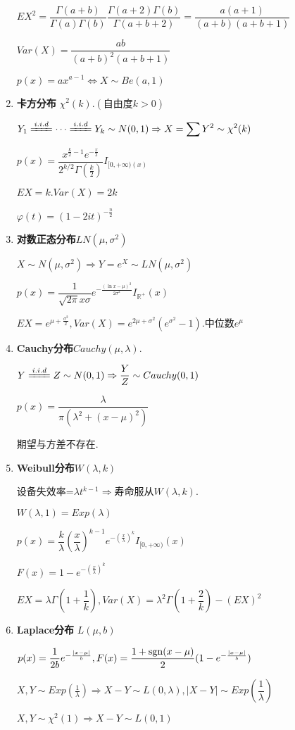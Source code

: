 \begin{enumerate}
    $ EX^2 = \dfrac{\Gamma(a+b)}{\Gamma(a)\Gamma(b)}\dfrac{\Gamma(a+2)\Gamma(b)}{\Gamma(a+b+2)} = \dfrac{a(a+1)}{(a+b)(a+b+1)}$

    $ Var(X) = \dfrac{ab}{(a+b)^2(a+b+1)}$

    $ p(x)=ax^{a-1}\Leftrightarrow X\sim Be(a,1)$

  \item \textbf{卡方分布} $ \chi^2(k).(自由度k>0)$

    $ Y_1 \xlongequal{i.i.d} \cdots \xlongequal{i.i.d} Y_k \sim N(0,1)
    \Rightarrow X = \sum{Y^2}\sim \chi^2(k)$

  $ p(x) = \dfrac{x^{\frac{k}{2}-1}e^{-\frac{x}{2}}}{2^{k/2}\Gamma(\frac{k}{2})} I_{[0,+\infty)(x)}$

    $ EX = k. Var(X) = 2k$

    $ \varphi(t) = (1-2it)^{-\frac{n}{2}}$

  \item \textbf{对数正态分布}$ LN(\mu, \sigma^2)$

    $ X\sim N(\mu,\sigma^2)\Rightarrow Y = e^{X}\sim LN(\mu,\sigma^2)$

    $ p(x) = \dfrac{1}{\sqrt{2\pi}x\sigma}e^{-\frac{(\ln x- \mu)^2}{2\sigma^2}}I_{\mathbb{R}^{+}}(x)$

    $ EX = e^{\mu + \frac{\sigma^2}{2}}, Var(X) = e^{2\mu+\sigma^2}(e^{\sigma^2}-1). 中位数e^\mu$

  \item \textbf{Cauchy分布}$ Cauchy(\mu, \lambda).$

    $ Y \xlongequal{i.i.d} Z \sim N(0,1) \Rightarrow \dfrac{Y}{Z}\sim Cauchy(0,1)$

    $ p(x) = \dfrac{\lambda}{\pi(\lambda^2 +(x-\mu)^2)}$

    期望与方差不存在.

  \item \textbf{Weibull分布}$ W(\lambda,k)$

    设备失效率=$ \lambda t^{k-1}\Rightarrow  寿命服从W(\lambda,k). $

    $ W(\lambda,1) = Exp(\lambda)$

    $ p(x) = \dfrac{k}{\lambda}(\dfrac{x}{\lambda})^{k-1}e^{-(\frac{x}{\lambda})^k}I_{[0,+\infty)}(x)$

      $ F(x) = 1-e^{-(\frac{x}{\lambda})^k}$

      $ EX = \lambda \Gamma(1+\dfrac{1}{k}), Var(X) = \lambda^2\Gamma(1+\dfrac{2}{k})-(EX)^2$

    \item \textbf{Laplace分布} $ L(\mu,b)$

      $ p(x)=\dfrac{1}{2b}e^{-\frac{|x-\mu|}{b}}, F(x)=\dfrac{1+\operatorname{sgn}(x-\mu)}{2}(1-e^{-\frac{|x-\mu|}{b}})$

      $ X,Y\sim Exp(\frac{1}{\lambda})\Rightarrow X-Y\sim L(0,\lambda), |X-Y|\sim Exp(\dfrac{1}{\lambda})$

      $ X,Y\sim \chi^2(1)\Rightarrow X-Y\sim L(0,1)$

\end{enumerate}

